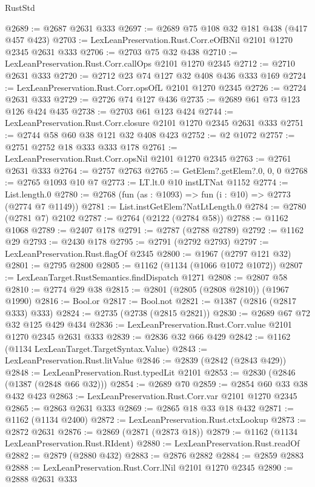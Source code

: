\begin{lexlean}{RustStd}
\begin{coremodule}
@2689 := @2687 @2631 @333
@2697 := @2689 @75 @108 @32 @181 @438 (@417 @457 @423)
@2703 := LexLeanPreservation.Rust.Corr.eOfBNil @2101 @1270 @2345 @2631 @333
@2706 := @2703 @75 @32 @438
@2710 := LexLeanPreservation.Rust.Corr.callOps @2101 @1270 @2345
@2712 := @2710 @2631 @333
@2720 := @2712 @23 @74 @127 @32 @408 @436 @333 @169
@2724 := LexLeanPreservation.Rust.Corr.opsOfL @2101 @1270 @2345
@2726 := @2724 @2631 @333
@2729 := @2726 @74 @127 @436
@2735 := @2689 @61 @73 @123 @126 @424 @435
@2738 := @2703 @61 @123 @424
@2744 := LexLeanPreservation.Rust.Corr.closure @2101 @1270 @2345 @2631 @333
@2751 := @2744 @58 @60 @38 @121 @32 @408 @423
@2752 := @2 @1072
@2757 := @2751 @2752 @18 @333 @333 @178
@2761 := LexLeanPreservation.Rust.Corr.opsNil @2101 @1270 @2345
@2763 := @2761 @2631 @333
@2764 := @2757 @2763
@2765 := GetElem?.getElem?.{0, 0, 0}
@2768 := @2765 @1093 @10 @7
@2773 := LT.lt.{0} @10 instLTNat @1152
@2774 := List.length.{0}
@2780 := @2768 (fun (as : @1093) => fun (i : @10) => @2773 (@2774 @7 @1149))
@2781 := List.instGetElem?NatLtLength.{0}
@2784 := @2780 (@2781 @7) @2102
@2787 := @2764 (@2122 (@2784 @58))
@2788 := @1162 @1068
@2789 := @2407 @178
@2791 := @2787 (@2788 @2789)
@2792 := @1162 @29
@2793 := @2430 @178
@2795 := @2791 (@2792 @2793)
@2797 := LexLeanPreservation.Rust.flagOf @2345
@2800 := @1967 (@2797 @121 @32)
@2801 := @2795 @2800
@2805 := @1162 (@1134 (@1066 @1072 @1072))
@2807 := LexLeanTarget.RustSemantics.findDispatch @1271
@2808 := @2807 @58
@2810 := @2774 @29 @38
@2815 := @2801 (@2805 (@2808 @2810)) (@1967 @1990)
@2816 := Bool.or
@2817 := Bool.not
@2821 := @1387 (@2816 (@2817 @333) @333)
@2824 := @2735 (@2738 (@2815 @2821))
@2830 := @2689 @67 @72 @32 @125 @429 @434
@2836 := LexLeanPreservation.Rust.Corr.value @2101 @1270 @2345 @2631 @333
@2839 := @2836 @32 @66 @429
@2842 := @1162 (@1134 LexLeanTarget.TargetSyntax.Value)
@2843 := LexLeanPreservation.Rust.litValue
@2846 := @2839 (@2842 (@2843 @429))
@2848 := LexLeanPreservation.Rust.typedLit @2101
@2853 := @2830 (@2846 (@1387 (@2848 @66 @32)))
@2854 := @2689 @70
@2859 := @2854 @60 @33 @38 @432 @423
@2863 := LexLeanPreservation.Rust.Corr.var @2101 @1270 @2345
@2865 := @2863 @2631 @333
@2869 := @2865 @18 @33 @18 @432
@2871 := @1162 (@1134 @2400)
@2872 := LexLeanPreservation.Rust.ctxLookup
@2873 := @2872 @2631
@2876 := @2869 (@2871 (@2873 @18))
@2879 := @1162 (@1134 LexLeanPreservation.Rust.RIdent)
@2880 := LexLeanPreservation.Rust.readOf
@2882 := @2879 (@2880 @432)
@2883 := @2876 @2882
@2884 := @2859 @2883
@2888 := LexLeanPreservation.Rust.Corr.lNil @2101 @1270 @2345
@2890 := @2888 @2631 @333

\end{coremodule}
\end{lexlean}
